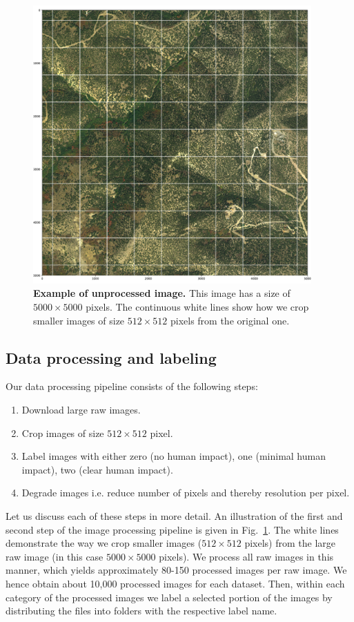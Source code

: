 \begin{figure}[h!]
	\centering
	\captionsetup{width=1\linewidth}
	\includegraphics[width=0.95\textwidth]{Figures/example_unproc.pdf}
	\caption{\textbf{Example of unprocessed image.} This image has a size of $5000\times5000$ pixels. The continuous white lines show how we crop smaller images of size $512\times512$ pixels from the original one.}
	\label{fig:example-unproc}
\end{figure}

\subsection{Data processing and labeling}

Our data processing pipeline consists of the following steps:
\begin{enumerate}
	\item Download large raw images.
	\item Crop images of size $512\times512$ pixel.
	\item Label images with either zero (no human impact), one (minimal human impact), two (clear human impact).
	\item Degrade images i.e. reduce number of pixels and thereby resolution per pixel.
\end{enumerate}

Let us discuss each of these steps in more detail. An illustration of the first and second step of the image processing pipeline is given in Fig.~\ref{fig:example-unproc}. The white lines demonstrate the way we crop smaller images ($512\times512$ pixels) from the large raw image (in this case $5000\times5000$ pixels). We process all raw images in this manner, which yields approximately 80-150 processed images per raw image. We hence obtain about 10,000 processed images for each dataset. Then, within each category of the processed images we label a selected portion of the images by distributing the files into folders with the respective label name. 

